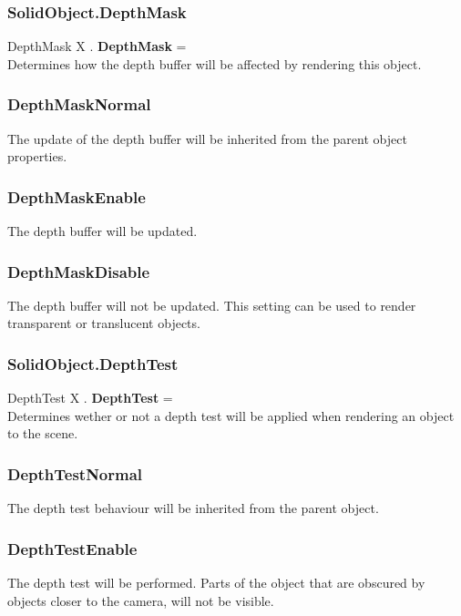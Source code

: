 \subsubsection{SolidObject.DepthMask \label{F:SolidObject:DepthMask}}
DepthMask X . \textbf{DepthMask} = \\
Determines how the depth buffer will be affected by rendering this object.

\subsubsection{DepthMaskNormal \label{T:DepthMask|DepthMaskNormal}}
The update of the depth buffer will be inherited from the parent object properties.

\subsubsection{DepthMaskEnable \label{T:DepthMask|DepthMaskEnable}}
The depth buffer will be updated.

\subsubsection{DepthMaskDisable \label{T:DepthMask|DepthMaskDisable}}
The depth buffer will not be updated. This setting can be used to render transparent or translucent objects.

\subsubsection{SolidObject.DepthTest \label{F:SolidObject:DepthTest}}
DepthTest X . \textbf{DepthTest} = \\
Determines wether or not a depth test will be applied when rendering an object to the scene.

\subsubsection{DepthTestNormal \label{T:DepthTest|DepthTestNormal}}
The depth test behaviour will be inherited from the parent object.

\subsubsection{DepthTestEnable \label{T:DepthTest|DepthTestEnable}}
The depth test will be performed. Parts of the object that are obscured by objects closer to the camera, will not be visible.

